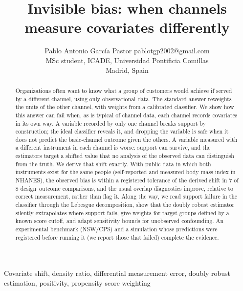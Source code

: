 \documentclass[twoside,11pt]{article}
\theoremstyle{plain}
\theoremstyle{definition}
\begin{document}
\title{Invisible bias: when channels measure covariates differently}

\author{\name Pablo Antonio Garc\'ia Pastor \email pablotgp2002@gmail.com \\
       \addr MSc student, ICADE, Universidad Pontificia Comillas\\
       Madrid, Spain}

\maketitle

\begin{abstract}
Organizations often want to know what a group of customers would achieve if served by a different channel, using only observational data. The standard answer reweights the units of the other channel, with weights from a calibrated classifier. We show how this answer can fail when, as is typical of channel data, each channel records covariates in its own way. A variable recorded by only one channel breaks support by construction; the ideal classifier reveals it, and dropping the variable is safe when it does not predict the basic-channel outcome given the others. A variable measured with a different instrument in each channel is worse: support can survive, and the estimators target a shifted value that no analysis of the observed data can distinguish from the truth. We derive that shift exactly. With public data in which both instruments exist for the same people (self-reported and measured body mass index in NHANES), the observed bias is within a registered tolerance of the derived shift in 7 of 8 design--outcome comparisons, and the usual overlap diagnostics improve, relative to correct measurement, rather than flag it. Along the way, we read support failure in the classifier through the Lebesgue decomposition, show that the doubly robust estimator silently extrapolates where support fails, give weights for target groups defined by a known score cutoff, and adapt sensitivity bounds for unobserved confounding. An experimental benchmark (NSW/CPS) and a simulation whose predictions were registered before running it (we report those that failed) complete the evidence.
\end{abstract}

\begin{keywords}
Covariate shift, density ratio, differential measurement error, doubly robust estimation, positivity, propensity score weighting
\end{keywords}
\end{document}
